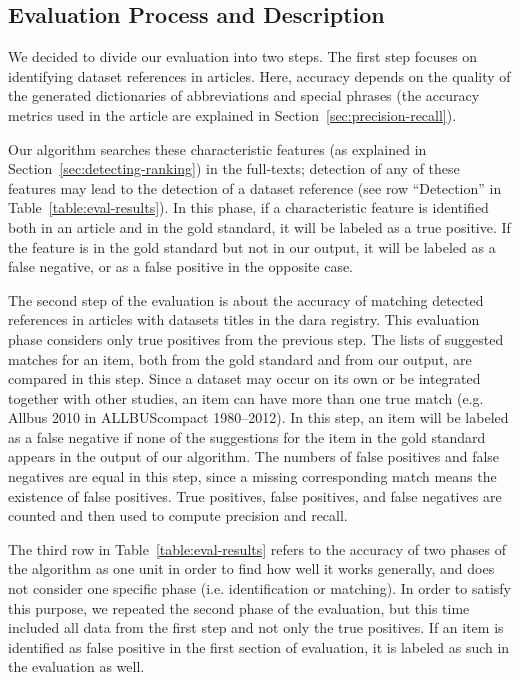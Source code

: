 \documentclass{IOS-Book-Article}
\newcommand{\dara}{\textsf{da\textbar ra}}
\begin{document}
 
\subsection{Evaluation Process and Description}
We decided to divide our evaluation into two steps.
The first step focuses on identifying dataset references in articles.
Here, accuracy depends on the quality of the generated dictionaries of abbreviations and special phrases 
(the accuracy metrics used in the article are explained in Section~\ref{sec:precision-recall}).
 
Our algorithm searches these characteristic features (as explained in Section~\ref{sec:detecting-ranking}) in the full-texts; detection of any of these features may lead to the detection of a dataset reference (see row \enquote{Detection} in Table~\ref{table:eval-results}).
In this phase, if a characteristic feature is identified both in an article and in the gold standard, it will be labeled as a true positive.
If the feature is in the gold standard but not in our output, it will be labeled as a false negative, or as a false positive in the opposite case.
 
The second step of the evaluation is about the accuracy of matching detected references in articles with datasets titles in the {\dara} registry.
This evaluation phase considers only true positives from the previous step.
The lists of suggested matches for an item, both from the gold standard and from our output, are compared in this step. 
Since a dataset may occur on its own or be integrated together with other studies,
an item can have more than one true match (e.g. Allbus 2010 in ALLBUScompact 1980--2012).
In this step, an item will be labeled as a false negative if none of the suggestions for the item in the gold standard appears in the output of our algorithm.
The numbers of false positives and false negatives are equal in this step, since a missing corresponding match means the existence of false positives.
True positives, false positives, and false negatives are counted and then used to compute precision and recall.

The third row in Table~\ref{table:eval-results} refers to the accuracy of two phases of the algorithm as one unit in order to find how well it works generally, and does not consider one specific phase (i.e. identification or matching).
In order to satisfy this purpose, we repeated the second phase of the evaluation, but this time included all data from the first step and not only the true positives.
If an item is identified as false positive in the first section of evaluation, it is labeled as such in the evaluation as well.   
 
\end{document}
